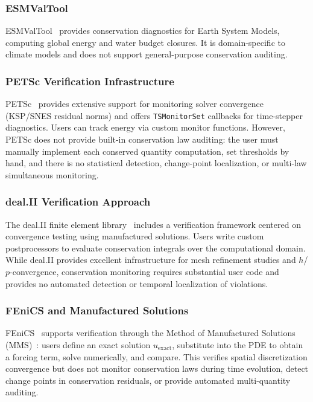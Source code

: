 \documentclass[11pt,a4paper]{article}
\begin{document}
\subsubsection{ESMValTool}
ESMValTool~\citep{eyring2020} provides conservation diagnostics for Earth System Models, computing global energy and water budget closures. It is domain-specific to climate models and does not support general-purpose conservation auditing.

\subsubsection{PETSc Verification Infrastructure}
PETSc~\citep{petsc2024} provides extensive support for monitoring solver convergence (KSP/SNES residual norms) and offers \texttt{TSMonitorSet} callbacks for time-stepper diagnostics. Users can track energy via custom monitor functions. However, PETSc does not provide built-in conservation law auditing: the user must manually implement each conserved quantity computation, set thresholds by hand, and there is no statistical detection, change-point localization, or multi-law simultaneous monitoring.

\subsubsection{deal.II Verification Approach}
The deal.II finite element library~\citep{dealii2019} includes a verification framework centered on convergence testing using manufactured solutions. Users write custom postprocessors to evaluate conservation integrals over the computational domain. While deal.II provides excellent infrastructure for mesh refinement studies and $h$/$p$-convergence, conservation monitoring requires substantial user code and provides no automated detection or temporal localization of violations.

\subsubsection{FEniCS and Manufactured Solutions}
FEniCS~\citep{fenics2015} supports verification through the Method of Manufactured Solutions (MMS)~\citep{roache2002}: users define an exact solution $u_{\text{exact}}$, substitute into the PDE to obtain a forcing term, solve numerically, and compare. This verifies spatial discretization convergence but does not monitor conservation laws during time evolution, detect change points in conservation residuals, or provide automated multi-quantity auditing.
\end{document}
